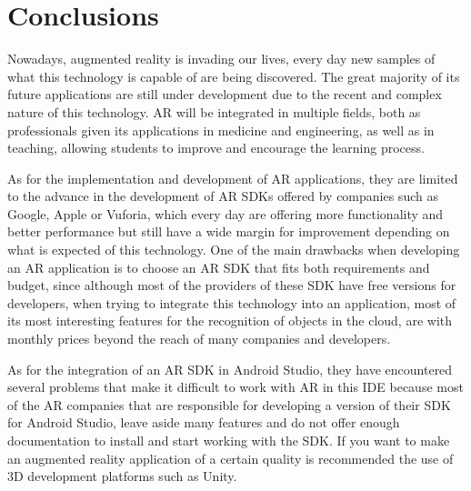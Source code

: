 \section{Conclusions}

Nowadays, augmented reality is invading our lives, every day new samples of what this technology is capable of are being discovered. The great majority of its future applications are still under development due to the recent and complex nature of this technology. AR will be integrated in multiple fields, both as professionals given its applications in medicine and engineering, as well as in teaching, allowing students to improve and encourage the learning process. 

As for the implementation and development of AR applications, they are limited to the advance in the development of AR SDKs offered by companies such as Google, Apple or Vuforia, which every day are offering more functionality and better performance but still have a wide margin for improvement depending on what is expected of this technology. One of the main drawbacks when developing an AR application is to choose an AR SDK that fits both requirements and budget, since although most of the providers of these SDK have free versions for developers, when trying to integrate this technology into an application, most of its most interesting features for the recognition of objects in the cloud, are with monthly prices beyond the reach of many companies and developers.

As for the integration of an AR SDK in Android Studio, they have encountered several problems that make it difficult to work with AR in this IDE because most of the AR companies that are responsible for developing a version of their SDK for Android Studio, leave aside many features and do not offer enough documentation to install and start working with the SDK. If you want to make an augmented reality application of a certain quality is recommended the use of 3D development platforms such as Unity.



